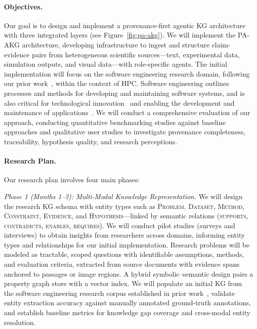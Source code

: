 \documentclass{files/proposalnsf}
\begin{document}
\paragraph{Objectives.} Our goal is to design and implement a provenance-first agentic KG architecture with three integrated layers (see Figure~\ref{fig:pa-akg}). We will implement the PA-AKG architecture, developing infrastructure to ingest and structure claim-evidence pairs from heterogeneous scientific sources---text, experimental data, simulation outputs, and visual data---with role-specific agents. The initial implementation will focus on the software engineering research domain, following our prior work~\cite{cusati2026fose}, within the context of HPC. Software engineering outlines processes and methods for developing and maintaining software systems, and is also critical for technological innovation~\cite{vos2026reclaiming} and enabling the development and maintenance of applications~\cite{schmidberger2012need}. We will conduct a comprehensive evaluation of our approach, conducting quantitative benchmarking studies against baseline approaches and qualitative user studies to investigate provenance completeness, traceability, hypothesis quality, and research perceptions. 

\paragraph{Research Plan.} Our research plan involves four main phases:

\textit{Phase 1 (Months 1--3): Multi-Modal Knowledge Representation.}
We will design the research KG schema with entity types such as \textsc{Problem}, \textsc{Dataset}, \textsc{Method}, \textsc{Constraint}, \textsc{Evidence}, and \textsc{Hypothesis}---linked by semantic relations (\textsc{supports}, \textsc{contradicts}, \textsc{enables}, \textsc{requires}). We will conduct pilot studies (\eg surveys and interviews) to obtain insights from researchers across domains, informing entity types and relationships for our initial implementation. Research problems will be modeled as tractable, scoped questions with identifiable assumptions, methods, and evaluation criteria, extracted from source documents with evidence spans anchored to passages or image regions. A hybrid symbolic--semantic design pairs a property graph store with a vector index. We will populate an initial KG from the software engineering research corpus established in prior work~\cite{cusati2026fose, brown2025esem}, validate entity extraction accuracy against manually annotated ground-truth annotations, and establish baseline metrics for knowledge gap coverage and cross-modal entity resolution.
\end{document}
